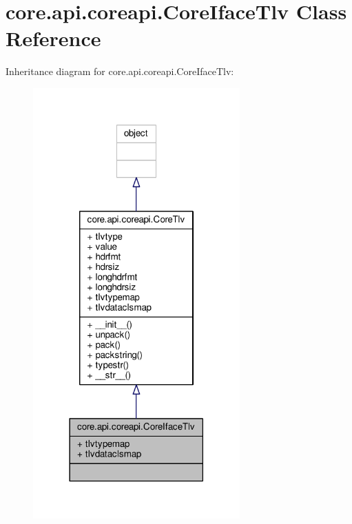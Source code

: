 \hypertarget{classcore_1_1api_1_1coreapi_1_1_core_iface_tlv}{\section{core.\+api.\+coreapi.\+Core\+Iface\+Tlv Class Reference}
\label{classcore_1_1api_1_1coreapi_1_1_core_iface_tlv}
}


Inheritance diagram for core.\+api.\+coreapi.\+Core\+Iface\+Tlv\+:
\nopagebreak
\begin{figure}[H]
\begin{center}
\leavevmode
\includegraphics[width=225pt]{classcore_1_1api_1_1coreapi_1_1_core_iface_tlv__inherit__graph}
\end{center}
\end{figure}


